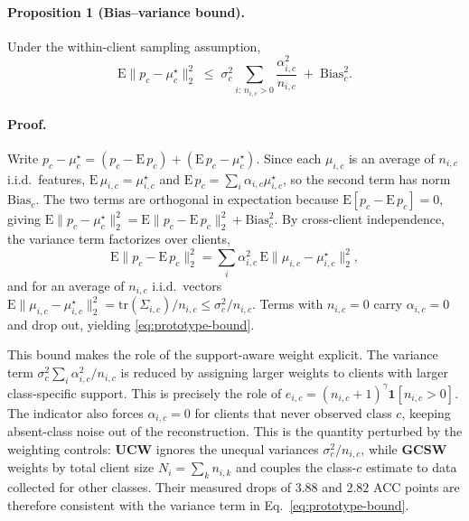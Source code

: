 \documentclass[letterpaper]{article}
\theoremstyle{definition}
\theoremstyle{plain}
\begin{document}
\paragraph{Proposition 1 (Bias--variance bound).}
\label{prop:bound}
Under the within-client sampling assumption,
\begin{equation}
\mathrm{E}\big\|p_c-\mu_c^{\star}\big\|_2^{2}
\;\le\;\sigma_c^{2}\sum_{i:\,n_{i,c}>0}\frac{\alpha_{i,c}^{2}}{n_{i,c}}
\;+\;\mathrm{Bias}_c^{2}.
\label{eq:prototype-bound}
\end{equation}

\paragraph{Proof.}
Write $p_c-\mu_c^{\star}=(p_c-\mathrm{E}\,p_c)+(\mathrm{E}\,p_c-\mu_c^{\star})$. Since each $\mu_{i,c}$ is an average of $n_{i,c}$ i.i.d.\ features, $\mathrm{E}\,\mu_{i,c}=\mu_{i,c}^{\star}$ and $\mathrm{E}\,p_c=\sum_i\alpha_{i,c}\mu_{i,c}^{\star}$, so the second term has norm $\mathrm{Bias}_c$. The two terms are orthogonal in expectation because $\mathrm{E}[p_c-\mathrm{E}\,p_c]=0$, giving
$\mathrm{E}\|p_c-\mu_c^{\star}\|_2^{2}=\mathrm{E}\|p_c-\mathrm{E}\,p_c\|_2^{2}+\mathrm{Bias}_c^{2}$.
By cross-client independence, the variance term factorizes over clients,
\begin{equation}
\mathrm{E}\|p_c-\mathrm{E}\,p_c\|_2^{2}
=\sum_{i}\alpha_{i,c}^{2}\,\mathrm{E}\|\mu_{i,c}-\mu_{i,c}^{\star}\|_2^{2},
\end{equation}
and for an average of $n_{i,c}$ i.i.d.\ vectors $\mathrm{E}\|\mu_{i,c}-\mu_{i,c}^{\star}\|_2^{2}=\mathrm{tr}(\Sigma_{i,c})/n_{i,c}\le\sigma_c^{2}/n_{i,c}$. Terms with $n_{i,c}=0$ carry $\alpha_{i,c}=0$ and drop out, yielding \eqref{eq:prototype-bound}.

This bound makes the role of the support-aware weight explicit. The variance term \(\sigma_c^2\sum_i\alpha_{i,c}^2/n_{i,c}\) is reduced by assigning larger weights to clients with larger class-specific support. This is precisely the role of \(e_{i,c}=(n_{i,c}+1)^{\gamma}\mathbf{1}[n_{i,c}>0]\). The indicator also forces \(\alpha_{i,c}=0\) for clients that never observed class \(c\), keeping absent-class noise out of the reconstruction. This is the quantity perturbed by the weighting controls: \textbf{UCW} ignores the unequal variances \(\sigma_c^2/n_{i,c}\), while \textbf{GCSW} weights by total client size \(N_i=\sum_k n_{i,k}\) and couples the class-\(c\) estimate to data collected for other classes. Their measured drops of \(3.88\) and \(2.82\) ACC points are therefore consistent with the variance term in Eq.~\eqref{eq:prototype-bound}.
\end{document}
